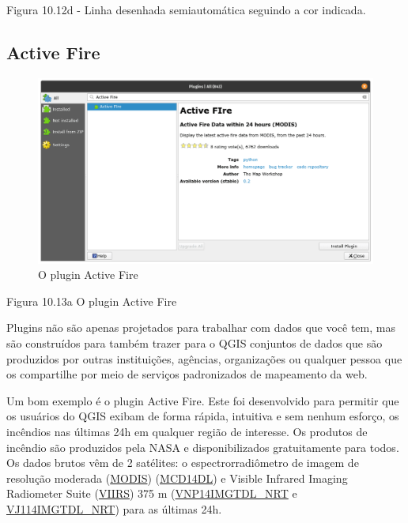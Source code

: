 \documentclass[
]{krantz}
\begin{document}
Figura 10.12d - Linha desenhada semiautomática seguindo a cor indicada.

\hypertarget{active-fire}{%
\subsection{Active Fire}\label{active-fire}}

\begin{figure}
\centering
\includegraphics{media/modulo10/fig1013_a.png}
\caption{O plugin Active Fire}
\end{figure}

Figura 10.13a O plugin Active Fire

Plugins não são apenas projetados para trabalhar com dados que você tem, mas são construídos para também trazer para o QGIS conjuntos de dados que são produzidos por outras instituições, agências, organizações ou qualquer pessoa que os compartilhe por meio de serviços padronizados de mapeamento da web.

Um bom exemplo é o plugin Active Fire. Este foi desenvolvido para permitir que os usuários do QGIS exibam de forma rápida, intuitiva e sem nenhum esforço, os incêndios nas últimas 24h em qualquer região de interesse. Os produtos de incêndio são produzidos pela NASA e disponibilizados gratuitamente para todos. Os dados brutos vêm de 2 satélites: o espectrorradiômetro de imagem de resolução moderada (\href{https://modis.gsfc.nasa.gov/}{MODIS}) (\href{https://earthdata.nasa.gov/earth-observation-data/near-real-time/firm/c6-mcd14dl}{MCD14DL}) e Visible Infrared Imaging Radiometer Suite (\href{https://www.jpss.noaa.gov/viirs.html}{VIIRS}) 375 m (\href{https://earthdata.nasa.gov/earth-observation-data/near-real-time/firms/v1-vnp14imgt}{VNP14IMGTDL\_NRT} e \href{https://earthdata.nasa.gov/earth-observation-data/near-real-time/firms/vj114imgtdl-nrt}{VJ114IMGTDL\_NRT}) para as últimas 24h.
\end{document}
